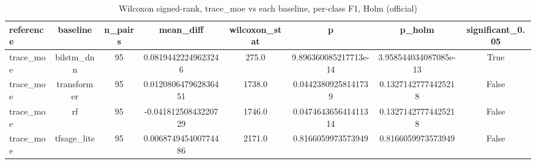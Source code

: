 \begin{table}[htbp]
\centering
\caption{Wilcoxon signed-rank, trace_moe vs each baseline, per-class F1, Holm (official)}
\label{tab:wilcoxon_trace_moe_vs_baselines_official}
\begin{tabular}{lccccccc}
\toprule
reference & baseline & n\_pairs & mean\_diff & wilcoxon\_stat & p & p\_holm & significant\_0.05 \\
\midrule
trace\_moe & bilstm\_dnn & 95 & 0.08194422249623246 & 275.0 & 9.896360085217713e-14 & 3.958544034087085e-13 & True \\
trace\_moe & transformer & 95 & 0.012080647962836451 & 1738.0 & 0.04423809258141739 & 0.13271427774425218 & False \\
trace\_moe & rf & 95 & -0.04181250843220729 & 1746.0 & 0.047464365641411314 & 0.13271427774425218 & False \\
trace\_moe & tfsage\_lite & 95 & 0.006874945400774486 & 2171.0 & 0.8166059973573949 & 0.8166059973573949 & False \\
\bottomrule
\end{tabular}
\end{table}